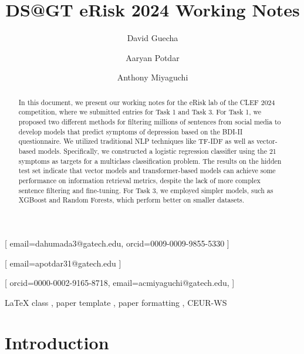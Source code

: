\documentclass[]{style/ceurart}
\begin{document}


\title{DS@GT eRisk 2024 Working Notes}

\author[1]{David Guecha}[
email=dahumada3@gatech.edu,
orcid=0009-0009-9855-5330
]
\author[1]{Aaryan Potdar}[
email=apotdar31@gatech.edu
]
\author[1]{Anthony Miyaguchi}[
orcid=0000-0002-9165-8718,
email=acmiyaguchi@gatech.edu,
]
\cormark[1]

\address[1]{Georgia Institute of Technology, North Ave NW, Atlanta, GA 30332}


\begin{abstract}
In this document, we present our working notes for the eRisk lab of the CLEF 2024 competition, where we submitted entries for Task 1 and Task 3. For Task 1, we proposed two different methods for filtering millions of sentences from social media to develop models that predict symptoms of depression based on the BDI-II questionnaire. We utilized traditional NLP techniques like TF-IDF as well as vector-based models. Specifically, we constructed a logistic regression classifier using the 21 symptoms as targets for a multiclass classification problem. The results on the hidden test set indicate that vector models and transformer-based models can achieve some performance on information retrieval metrics, despite the lack of more complex sentence filtering and fine-tuning. For Task 3, we employed simpler models, such as XGBoost and Random Forests, which perform better on smaller datasets.

\end{abstract}

\begin{keywords}
  LaTeX class \sep
  paper template \sep
  paper formatting \sep
  CEUR-WS
\end{keywords}


\maketitle

\section{Introduction}
\end{document}

